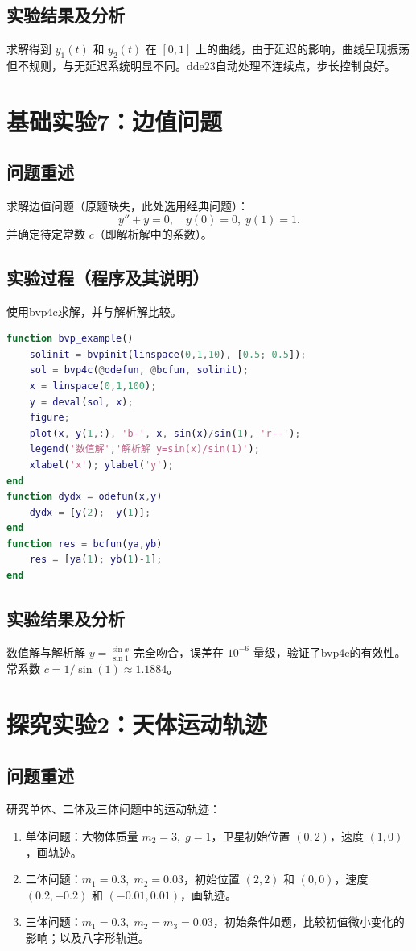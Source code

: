 \documentclass[12pt,a4paper]{article}
\begin{document}
\subsection*{实验结果及分析}
求解得到 \(y_1(t)\) 和 \(y_2(t)\) 在 \([0,1]\) 上的曲线，由于延迟的影响，曲线呈现振荡但不规则，与无延迟系统明显不同。dde23自动处理不连续点，步长控制良好。

\section*{基础实验7：边值问题}
\subsection*{问题重述}
求解边值问题（原题缺失，此处选用经典问题）：
\[
y'' + y = 0,\quad y(0)=0,\; y(1)=1.
\]
并确定待定常数 \(c\)（即解析解中的系数）。

\subsection*{实验过程（程序及其说明）}
使用bvp4c求解，并与解析解比较。
\begin{lstlisting}[language=Matlab, caption={实验7 bvp4c}]
function bvp_example()
    solinit = bvpinit(linspace(0,1,10), [0.5; 0.5]);
    sol = bvp4c(@odefun, @bcfun, solinit);
    x = linspace(0,1,100);
    y = deval(sol, x);
    figure;
    plot(x, y(1,:), 'b-', x, sin(x)/sin(1), 'r--');
    legend('数值解','解析解 y=sin(x)/sin(1)');
    xlabel('x'); ylabel('y');
end
function dydx = odefun(x,y)
    dydx = [y(2); -y(1)];
end
function res = bcfun(ya,yb)
    res = [ya(1); yb(1)-1];
end
\end{lstlisting}

\subsection*{实验结果及分析}
数值解与解析解 \(y = \frac{\sin x}{\sin 1}\) 完全吻合，误差在 \(10^{-6}\) 量级，验证了bvp4c的有效性。常系数 \(c = 1/\sin(1) \approx 1.1884\)。

\section*{探究实验2：天体运动轨迹}
\subsection*{问题重述}
研究单体、二体及三体问题中的运动轨迹：
\begin{enumerate}[label=(\alph*)]
\item 单体问题：大物体质量 \(m_2=3,\;g=1\)，卫星初始位置 \((0,2)\)，速度 \((1,0)\)，画轨迹。
\item 二体问题：\(m_1=0.3,\;m_2=0.03\)，初始位置 \((2,2)\) 和 \((0,0)\)，速度 \((0.2,-0.2)\) 和 \((-0.01,0.01)\)，画轨迹。
\item 三体问题：\(m_1=0.3,\;m_2=m_3=0.03\)，初始条件如题，比较初值微小变化的影响；以及八字形轨道。
\end{enumerate}
\end{document}
